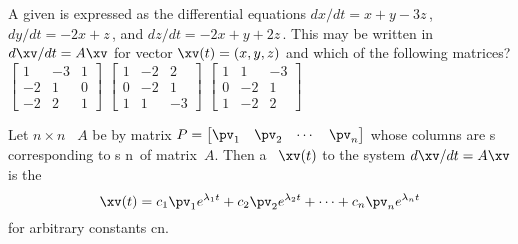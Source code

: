 \begin{activity}
A given  is expressed as the differential equations \(dx/dt=x+y-3z\)\,, \(dy/dt=-2x+z\)\,, and \(dz/dt=-2x+y+2z\)\,.
This may be written in  \(d\xv/dt=A\xv\) for vector \(\xv(t)=(x,y,z)\) and which of the following matrices?
{\(\begin{bmatrix} 1&-3&1
\\-2&1&0
\\-2&2&1 \end{bmatrix}\)}
{\(\begin{bmatrix} 1&-2&2
\\0&-2&1
\\1&1&-3 \end{bmatrix}\)}
{\(\begin{bmatrix} 1&1&-3
\\0&-2&1
\\1&-2&2 \end{bmatrix}\)}
\end{activity}




\begin{theorem} \label{thm:ddtsol}
Let \(n\times n\) ~\(A\) be  by matrix \(P=\begin{bmatrix} \pv_1&\pv_2&\cdots&\pv_n \end{bmatrix}\) whose columns are s corresponding to s \hlist\lambda n\ of matrix~\(A\).  
Then a ~\(\xv(t)\) to the  system \(d\xv/dt=A\xv\) is the 
\begin{equation}
\xv(t)=c_1\pv_1e^{\lambda_1t}+c_2\pv_2e^{\lambda_2t}+\cdots+c_n\pv_ne^{\lambda_nt}
\label{eq:ddtsol}
\end{equation}
for arbitrary constants \hlist cn.
\end{theorem}

